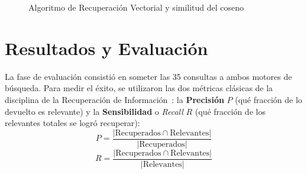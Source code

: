 \documentclass[conference,a4paper]{IEEEtran}
\begin{document}
\begin{figure}[htbp]
  \centering
  \caption{Algoritmo de Recuperación Vectorial y similitud del coseno}
  \label{pcd:ranking}
\end{figure}

\section{Resultados y Evaluación}

La fase de evaluación consistió en someter las 35 consultas a ambos motores de búsqueda. Para medir el éxito, se utilizaron las dos métricas clásicas de la disciplina de la Recuperación de Información~\cite{b8}: la \textbf{Precisión} $P$ (qué fracción de lo devuelto es relevante) y la \textbf{Sensibilidad} o \emph{Recall} $R$ (qué fracción de los relevantes totales se logró recuperar):
\begin{equation}
\label{eq:precision}
P = \frac{|\text{Recuperados} \cap \text{Relevantes}|}{|\text{Recuperados}|}
\end{equation}
\begin{equation}
\label{eq:recall}
R = \frac{|\text{Recuperados} \cap \text{Relevantes}|}{|\text{Relevantes}|}
\end{equation}
\end{document}
